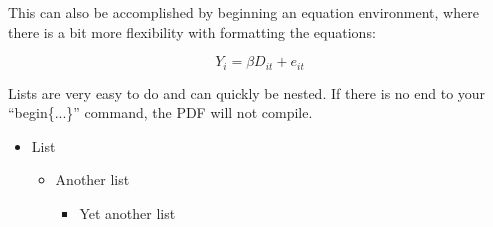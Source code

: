 \documentclass[12pt, letterpaper]{article}
\begin{document}
This can also be accomplished by beginning an equation environment, where there is a bit more flexibility with formatting the equations:

\begin{equation}
Y_i = \beta D_{it} + e_{it}
\end{equation}


\noindent Lists are very easy to do and can quickly be nested. If there is no end to your ``begin\{...\}'' command, the PDF will not compile.

\begin{itemize}
    \item List 
        \begin{itemize}
            \item Another list
                \begin{itemize}
                    \item Yet another list
                \end{itemize}
        \end{itemize}
\end{itemize}


\newpage

\printbibliography 
\end{document}
